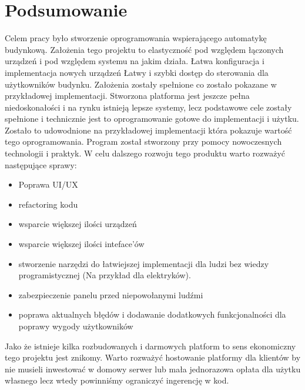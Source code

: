 \chapter{Podsumowanie}
\label{chap:podsumowanie}
Celem pracy było stworzenie oprogramowania wspierającego automatykę budynkową. Założenia tego projektu to elastyczność pod względem łączonych urządzeń i pod względem systemu na jakim działa. 
Łatwa konfiguracja i implementacja nowych urządzeń
Łatwy i szybki dostęp do sterowania dla użytkowników budynku.
Założenia zostały spełnione co zostało pokazane w przykładowej implementacji.
\newline
Stworzona platforma jest jeszcze pełna niedoskonałości i na rynku istnieją lepsze systemy, lecz podstawowe cele zostały spełnione i technicznie jest to oprogramowanie gotowe do implementacji i użytku. Zostało to udowodnione na przykładowej implementacji która pokazuje wartość tego oprogramowania. Program został stworzony przy pomocy nowoczesnych technologii i praktyk. W celu dalszego rozwoju tego produktu warto rozważyć następujące sprawy:
\begin{itemize}
    \item Poprawa UI/UX
    \item refactoring kodu
    \item wsparcie większej ilości urządzeń
    \item wsparcie większej ilości inteface'ów
    \item stworzenie narzędzi do łatwiejszej implementacji dla ludzi bez wiedzy programistycznej (Na przykład dla elektryków).
    \item zabezpieczenie panelu przed niepowołanymi ludźmi
    \item poprawa aktualnych błędów i dodawanie dodatkowych funkcjonalności dla poprawy wygody użytkowników
\end{itemize}
Jako że istnieje kilka rozbudowanych i darmowych platform to sens ekonomiczny tego projektu jest znikomy. Warto rozważyć hostowanie platformy dla klientów by nie musieli inwestować w domowy serwer lub mała jednorazowa opłata dla użytku własnego lecz wtedy powinniśmy ograniczyć ingerencję w kod. 